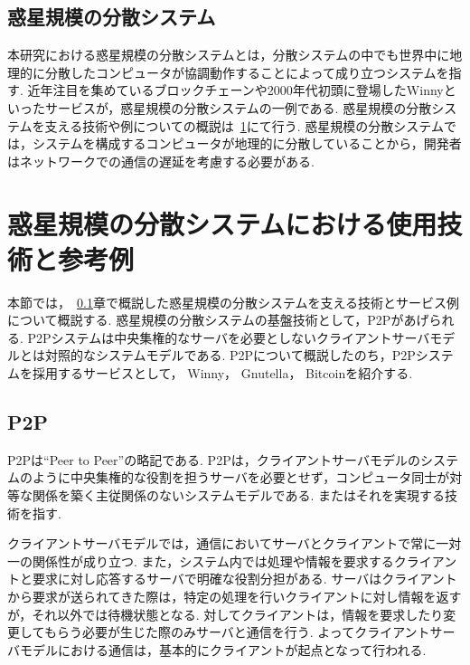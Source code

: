 \subsection{惑星規模の分散システム}
\label{bg:definition:planetary-scale-distributed-system}

本研究における惑星規模の分散システムとは，分散システムの中でも世界中に地理的に分散したコンピュータが協調動作することによって成り立つシステムを指す.
近年注目を集めているブロックチェーンや2000年代初頭に登場したWinnyといったサービスが，惑星規模の分散システムの一例である.
惑星規模の分散システムを支える技術や例についての概説は~\ref{bg:planetary-scale-distributed-system}にて行う.
惑星規模の分散システムでは，システムを構成するコンピュータが地理的に分散していることから，開発者はネットワークでの通信の遅延を考慮する必要がある.

\section{惑星規模の分散システムにおける使用技術と参考例}
\label{bg:planetary-scale-distributed-system}

本節では，~\ref{bg:definition:planetary-scale-distributed-system}章で概説した惑星規模の分散システムを支える技術とサービス例について概説する.
惑星規模の分散システムの基盤技術として，P2Pがあげられる.
P2Pシステムは中央集権的なサーバを必要としないクライアントサーバモデルとは対照的なシステムモデルである.
P2Pについて概説したのち，P2Pシステムを採用するサービスとして， Winny， Gnutella， Bitcoinを紹介する.

\subsection{P2P}
\label{bg:planetary-scale-distributed-system:p2p}

P2Pは``Peer to Peer''の略記である.
P2Pは，クライアントサーバモデルのシステムのように中央集権的な役割を担うサーバを必要とせず，コンピュータ同士が対等な関係を築く主従関係のないシステムモデルである.
またはそれを実現する技術を指す.

クライアントサーバモデルでは，通信においてサーバとクライアントで常に一対一の関係性が成り立つ.
また，システム内では処理や情報を要求するクライアントと要求に対し応答するサーバで明確な役割分担がある.
サーバはクライアントから要求が送られてきた際は，特定の処理を行いクライアントに対し情報を返すが，それ以外では待機状態となる.
対してクライアントは，情報を要求したり変更してもらう必要が生じた際のみサーバと通信を行う.
よってクライアントサーバモデルにおける通信は，基本的にクライアントが起点となって行われる.

